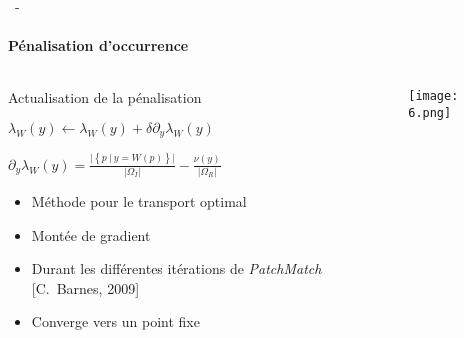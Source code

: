 \documentclass[aspectratio=169, 22pt]{beamer}
\begin{document}
\begin{frame}{\secname~- \subsecname}
  \framesubtitle{Pénalisation d'occurrence}
  \begin{columns}
    \begin{column}{0.5\linewidth}      
      \begin{block}{Actualisation de la pénalisation}
        \small
        \begin{center}
          $\lambda_W(y) \leftarrow \lambda_W(y) + \delta \partial_y \lambda_W(y) $
          
          $\partial_y\lambda_W(y) = \frac{\lvert\left\{p\ |\ y =
              W(p)\right\}\rvert}{\lvert\Omega_I\rvert} -
          \frac{\nu(y)}{\lvert\Omega_R\rvert}$
        \end{center}
        
        \begin{itemize}
        \item Méthode pour le transport optimal
        \item Montée de gradient
        \item Durant les différentes itérations de \emph{PatchMatch} [C.~Barnes, 2009]
        \item Converge vers un point fixe
        \end{itemize}
      \end{block}    
    \end{column}
    
    \begin{column}{0.5\linewidth}
      \begin{figure}
        \centering
        \texttt{[image: 6.png]}
      \end{figure}
    \end{column}
  \end{columns}
\end{frame}
\end{document}
